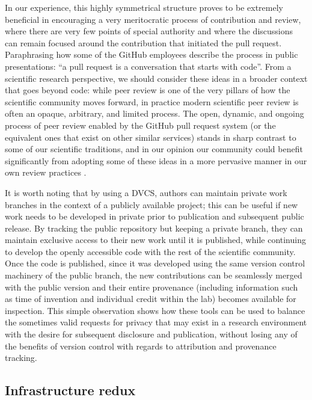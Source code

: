 \documentclass[ChapterTOCs,krantz2]{krantz} %
\theoremstyle{definition}
\begin{document}
In our experience, this highly symmetrical structure proves to be extremely
beneficial in encouraging a very meritocratic process of contribution and
review, where there are very few points of special authority and where the
discussions can remain focused around the contribution that initiated the pull
request.  Paraphrasing how some of the GitHub employees describe the process in
public presentations: ``a pull request is a conversation that starts with
code''.  From a scientific research perspective, we should consider these ideas
in a broader context that goes beyond code: while peer review is one of the
very pillars of how the scientific community moves forward, in practice modern
scientific peer review is often an opaque, arbitrary, and limited process.  The
open, dynamic, and ongoing process of peer review enabled by the GitHub pull
request system (or the equivalent ones that exist on other similar services)
stands in sharp contrast to some of our scientific traditions, and in our
opinion our community could benefit significantly from adopting some of these
ideas in a more pervasive manner in our own review practices
\cite{10.3389/fncom.2012.00018}.

It is worth noting that by using a DVCS, authors can maintain private work
branches in the context of a publicly available project; this can be useful if
new work needs to be developed in private prior to publication and subsequent
public release. By tracking the public repository but keeping a private branch,
they can maintain exclusive access to their new work until it is published,
while continuing to develop the openly accessible code with the rest of the
scientific community. Once the code is published, since it was developed using
the same version control machinery of the public branch, the new contributions
can be seamlessly merged with the public version and their entire provenance
(including information such as time of invention and individual credit within
the lab) becomes available for inspection.  This simple observation shows how
these tools can be used to balance the sometimes valid requests for privacy
that may exist in a research environment with the desire for subsequent
disclosure and publication, without losing any of the benefits of version
control with regards to attribution and provenance tracking.

\subsection{Infrastructure redux}
\end{document}
